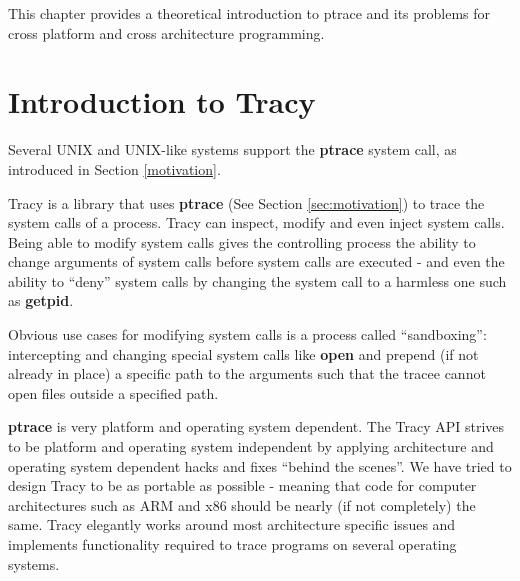 \documentclass[a4paper, 10pt]{report}
\begin{document}
This chapter provides a theoretical introduction to ptrace and its problems for
cross platform and cross architecture programming.

\section{Introduction to Tracy}

Several UNIX and UNIX-like systems support the \textbf{ptrace} system call, as
introduced in Section \ref{motivation}.


Tracy is a library that uses \textbf{ptrace} (See Section \ref{sec:motivation})
to trace the system calls of a process. Tracy can inspect, modify and even
inject system calls. Being able to modify system calls gives the controlling
process the ability to change arguments of system calls before system calls
are executed - and even the ability to ``deny'' system calls by changing the
system call to a harmless one such as \textbf{getpid}.

Obvious use cases for modifying system calls is a process
called ``sandboxing'': intercepting and changing special system calls like
\textbf{open} and prepend (if not already in place) a specific path to the
arguments such that the tracee cannot open files outside a specified path.

\textbf{ptrace} is very platform and operating system dependent.
The Tracy API strives to be platform and operating system independent by
applying architecture and operating system dependent hacks and fixes
``behind the scenes''. We have tried to design Tracy to be as portable as
possible - meaning that code for computer architectures such as ARM and
x86 should be nearly (if not completely) the same.
Tracy elegantly works around most architecture specific issues and implements
functionality required to trace programs on several operating systems.
\end{document}
